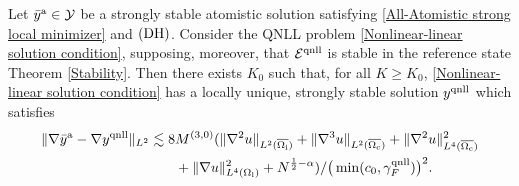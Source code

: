 \begin{theorem}\label{Priori of NCG}
	Let $\bar{y}^{{\rm a}} \in \mathcal{Y}$ be a strongly stable atomistic solution satisfying \eqref{All-Atomistic strong local minimizer} and $\textbf{\rm (DH)}$. Consider the QNLL problem \eqref{Nonlinear-linear solution condition}, supposing, moreover, that $\mathcal{E}^{{\rm qnll}}$ is stable in the reference state Theorem \ref{Stability}. Then there exists $K_0$ such that, for all $K \ge K_0$, \eqref{Nonlinear-linear solution condition} has a locally unique, strongly stable solution $y^{{\rm qnll}}$ which satisfies
	\begin{equation}
		\begin{aligned}
			\Vert \nabla\bar{y}^{{\rm a}} - \nabla y^{{\rm qnll}} \Vert_{L^2} \lesssim 8&M^{(3,0)}(\Vert \nabla^{2} u\Vert_{L^{2}(\overline{\Omega_{{\rm i}}})} +\Vert \nabla^{3}u \Vert_{L^{2}(\overline{\Omega_{{\rm c}}})}+\Vert \nabla^{2}u \Vert^{2}_{L^{4}(\overline{\Omega_{{\rm c}}})}\\
			&+ \Vert \nabla u \Vert^{2}_{L^{4}(\Omega_{{\rm l}})}+N^{\frac{1}{2}-\alpha})/\big(\min(c_{0},\gamma^{{\rm qnll}}_{F})\big)^2.
		\end{aligned}
	\end{equation}
	
\end{theorem}
